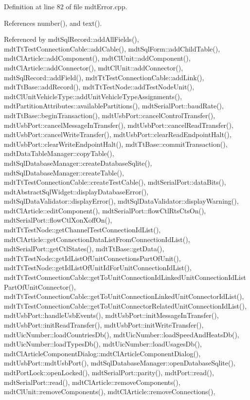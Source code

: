 Definition at line 82 of file mdt\-Error.\-cpp.



References number(), and text().



Referenced by mdt\-Sql\-Record\-::add\-All\-Fields(), mdt\-Tt\-Test\-Connection\-Cable\-::add\-Cable(), mdt\-Sql\-Form\-::add\-Child\-Table(), mdt\-Cl\-Article\-::add\-Component(), mdt\-Cl\-Unit\-::add\-Component(), mdt\-Cl\-Article\-::add\-Connector(), mdt\-Cl\-Unit\-::add\-Connector(), mdt\-Sql\-Record\-::add\-Field(), mdt\-Tt\-Test\-Connection\-Cable\-::add\-Link(), mdt\-Tt\-Base\-::add\-Record(), mdt\-Tt\-Test\-Node\-::add\-Test\-Node\-Unit(), mdt\-Cl\-Unit\-Vehicle\-Type\-::add\-Unit\-Vehicle\-Type\-Assignments(), mdt\-Partition\-Attributes\-::available\-Partitions(), mdt\-Serial\-Port\-::baud\-Rate(), mdt\-Tt\-Base\-::begin\-Transaction(), mdt\-Usb\-Port\-::cancel\-Control\-Transfer(), mdt\-Usb\-Port\-::cancel\-Message\-In\-Transfer(), mdt\-Usb\-Port\-::cancel\-Read\-Transfer(), mdt\-Usb\-Port\-::cancel\-Write\-Transfer(), mdt\-Usb\-Port\-::clear\-Read\-Endpoint\-Halt(), mdt\-Usb\-Port\-::clear\-Write\-Endpoint\-Halt(), mdt\-Tt\-Base\-::commit\-Transaction(), mdt\-Data\-Table\-Manager\-::copy\-Table(), mdt\-Sql\-Database\-Manager\-::create\-Database\-Sqlite(), mdt\-Sql\-Database\-Manager\-::create\-Table(), mdt\-Tt\-Test\-Connection\-Cable\-::create\-Test\-Cable(), mdt\-Serial\-Port\-::data\-Bits(), mdt\-Abstract\-Sql\-Widget\-::display\-Database\-Error(), mdt\-Sql\-Data\-Validator\-::display\-Error(), mdt\-Sql\-Data\-Validator\-::display\-Warning(), mdt\-Cl\-Article\-::edit\-Component(), mdt\-Serial\-Port\-::flow\-Ctl\-Rts\-Cts\-On(), mdt\-Serial\-Port\-::flow\-Ctl\-Xon\-Xoff\-On(), mdt\-Tt\-Test\-Node\-::get\-Channel\-Test\-Connection\-Id\-List(), mdt\-Cl\-Article\-::get\-Connection\-Data\-List\-From\-Connection\-Id\-List(), mdt\-Serial\-Port\-::get\-Ctl\-States(), mdt\-Tt\-Base\-::get\-Data(), mdt\-Tt\-Test\-Node\-::get\-Id\-List\-Of\-Unit\-Connections\-Part\-Of\-Unit(), mdt\-Tt\-Test\-Node\-::get\-Id\-List\-Of\-Unit\-Id\-For\-Unit\-Connection\-Id\-List(), mdt\-Tt\-Test\-Connection\-Cable\-::get\-To\-Unit\-Connection\-Id\-Linked\-Unit\-Connection\-Id\-List\-Part\-Of\-Unit\-Connector(), mdt\-Tt\-Test\-Connection\-Cable\-::get\-To\-Unit\-Connection\-Linked\-Unit\-Connector\-Id\-List(), mdt\-Tt\-Test\-Connection\-Cable\-::get\-To\-Unit\-Connector\-Related\-Unit\-Connection\-Id\-List(), mdt\-Usb\-Port\-::handle\-Usb\-Events(), mdt\-Usb\-Port\-::init\-Message\-In\-Transfer(), mdt\-Usb\-Port\-::init\-Read\-Transfer(), mdt\-Usb\-Port\-::init\-Write\-Transfer(), mdt\-Uic\-Number\-::load\-Countries\-Db(), mdt\-Uic\-Number\-::load\-Speed\-And\-Heats\-Db(), mdt\-Uic\-Number\-::load\-Types\-Db(), mdt\-Uic\-Number\-::load\-Usages\-Db(), mdt\-Cl\-Article\-Component\-Dialog\-::mdt\-Cl\-Article\-Component\-Dialog(), mdt\-Usb\-Port\-::mdt\-Usb\-Port(), mdt\-Sql\-Database\-Manager\-::open\-Database\-Sqlite(), mdt\-Port\-Lock\-::open\-Locked(), mdt\-Serial\-Port\-::parity(), mdt\-Port\-::read(), mdt\-Serial\-Port\-::read(), mdt\-Cl\-Article\-::remove\-Components(), mdt\-Cl\-Unit\-::remove\-Components(), mdt\-Cl\-Article\-::remove\-Connections(), 